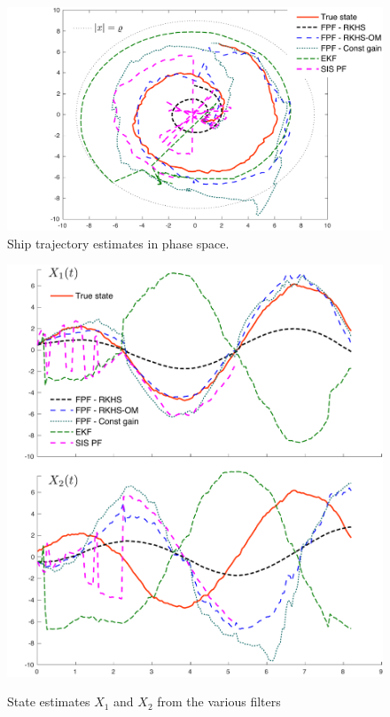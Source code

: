 \begin{figure}[htbp]
   \centering
	\includegraphics[width=6in]{images/Chap4_ship_state_comparison}
	\caption{Ship trajectory estimates in phase space.}
	\label{fig:ship_state_estimate}
\end{figure}
\begin{figure}[htbp]
	
	\centering
	\includegraphics[width =6in] {images/Chap4_ship_state12_comparison}
	\label{fig:ship_state_time_estimate}
	\caption{ State estimates $X_1$ and $X_2$ from the various filters}
\end{figure}

